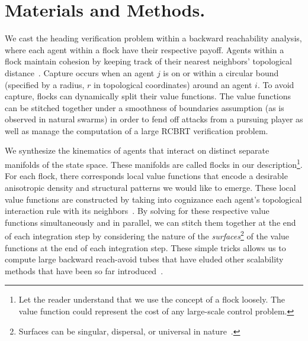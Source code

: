 \section{Materials and Methods.}
\label{sec:methods}
%
We cast the heading verification problem within a backward reachability analysis, where each agent within a flock have their respective payoff. Agents within a flock maintain cohesion by keeping track of their nearest neighbors' topological distance~\cite{Ballerini1232}. Capture occurs when an agent $j$ is on or within a circular bound (specified by a radius, $r$ in topological coordinates) around an agent $i$.  To avoid capture, flocks can dynamically split their value functions. The value functions can be stitched together under a smoothness of boundaries assumption (as is observed in natural swarms) in order to fend off attacks from a pursuing player as well as manage the computation of a large RCBRT verification problem.

%
 We synthesize the kinematics of agents that interact on distinct separate manifolds of the state space. These manifolds are called flocks in our description\footnote{Let the reader understand that we use the concept of a flock loosely. The value function could represent the cost of any large-scale control problem.}. For each flock, there corresponds local value functions that encode a desirable anisotropic density and structural patterns we would like to emerge.  These local value functions are constructed by  taking into cognizance each agent's topological interaction rule with its neighbors~\cite{Ballerini1232}. By solving for these respective value functions simultaneously and in parallel, we can stitch them together at the end of each integration step by considering the nature of the \textit{surfaces}\footnote{Surfaces can be  singular, dispersal, or universal in nature~\cite{Isaacs1965}.} of the value functions at the end of each integration step. These simple tricks allows us to compute large backward reach-avoid tubes that have eluded other scalability methods that have been so far introduced~\cite{Bansal, SylviaScalability, DecompChenHerbert}.
 
